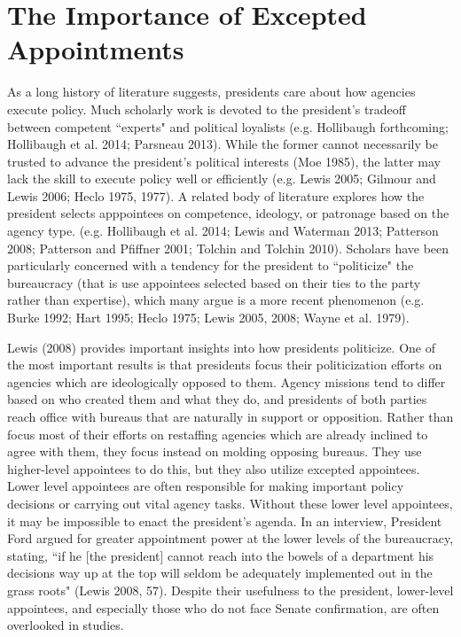 \documentclass[12pt]{article}
\begin{document}
\section*{The Importance of Excepted Appointments}

	As a long history of literature suggests, presidents care about how agencies execute policy. Much scholarly work is devoted to the president's tradeoff between competent ``experts" and political loyalists (e.g. Hollibaugh forthcoming; Hollibaugh et al. 2014; Parsneau 2013). While the former cannot necessarily be trusted to advance the president's political interests (Moe 1985), the latter may lack the skill to execute policy well or efficiently (e.g. Lewis 2005; Gilmour and Lewis 2006; Heclo 1975, 1977). A related body of literature explores how the president selects apppointees on competence, ideology, or patronage based on the agency type. (e.g. Hollibaugh et al. 2014; Lewis and Waterman 2013; Patterson 2008; Patterson and Pfiffner 2001; Tolchin and Tolchin 2010). Scholars have been particularly concerned with a tendency for the president to ``politicize" the bureaucracy (that is use appointees selected based on their ties to the party rather than expertise), which many argue is a more recent phenomenon (e.g. Burke 1992; Hart 1995; Heclo 1975; Lewis 2005, 2008; Wayne et al. 1979).
	
Lewis (2008) provides important insights into how presidents politicize. One of the most important results is that presidents focus their politicization efforts on agencies which are ideologically opposed to them. Agency missions tend to differ based on who created them and what they do, and presidents of both parties reach office with bureaus that are naturally in support or opposition. Rather than focus most of their efforts on restaffing agencies which are already inclined to agree with them, they focus instead on molding opposing bureaus. They use higher-level appointees to do this, but they also utilize excepted appointees. Lower level appointees are often responsible for making important policy decisions or carrying out vital agency tasks. Without these lower level appointees, it may be impossible to enact the president's agenda. In an interview, President Ford argued for greater appointment power at the lower levels of the bureaucracy, stating, ``if he [the president] cannot reach into the bowels of a department his decisions way up at the top will seldom be adequately implemented out in the grass roots" (Lewis 2008, 57). Despite their usefulness to the president, lower-level appointees, and especially those who do not face Senate confirmation, are often overlooked in studies.
	
\end{document}

